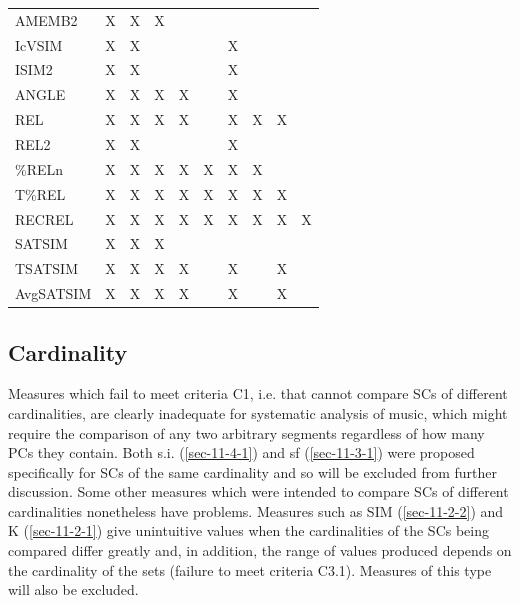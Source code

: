 \documentclass{article}
\begin{document}
\begin{table}[htb]
\begin{center}
\begin{tabular}{llllllllll}
 AMEMB2      &  X   &  X   &  X     &        &        &        &      &      &      \\
 IcVSIM      &  X   &  X   &        &        &        &  X     &      &      &      \\
 ISIM2       &  X   &  X   &        &        &        &  X     &      &      &      \\
 ANGLE       &  X   &  X   &  X     &  X     &        &  X     &      &      &      \\
 REL         &  X   &  X   &  X     &  X     &        &  X     &  X   &  X   &      \\
 REL2        &  X   &  X   &        &        &        &  X     &      &      &      \\
 \%RELn      &  X   &  X   &  X     &  X     &  X     &  X     &  X   &      &      \\
 T\%REL      &  X   &  X   &  X     &  X     &  X     &  X     &  X   &  X   &      \\
 RECREL      &  X   &  X   &  X     &  X     &  X     &  X     &  X   &  X   &  X   \\
 SATSIM      &  X   &  X   &  X     &        &        &        &      &      &      \\
 TSATSIM     &  X   &  X   &  X     &  X     &        &  X     &      &  X   &      \\
 AvgSATSIM   &  X   &  X   &  X     &  X     &        &  X     &      &  X   &      \\
\hline
\end{tabular}
\end{center}
\end{table}
\subsection{Cardinality}
\label{sec-6-2}

Measures which fail to meet criteria C1, i.e. that cannot compare SCs
of different cardinalities, are clearly inadequate for systematic
analysis of music, which might require the comparison of any two
arbitrary segments regardless of how many PCs they contain. Both
s.i. (\ref{sec-11-4-1}) and sf (\ref{sec-11-3-1}) were proposed specifically for SCs of the same
cardinality and so will be excluded from further discussion. Some
other measures which were intended to compare SCs of different
cardinalities nonetheless have problems. Measures such as SIM (\ref{sec-11-2-2})
and K (\ref{sec-11-2-1}) give unintuitive values when the cardinalities of the SCs
being compared differ greatly and, in addition, the range of values
produced depends on the cardinality of the sets (failure to meet
criteria C3.1). Measures of this type will also be excluded.
\end{document}
